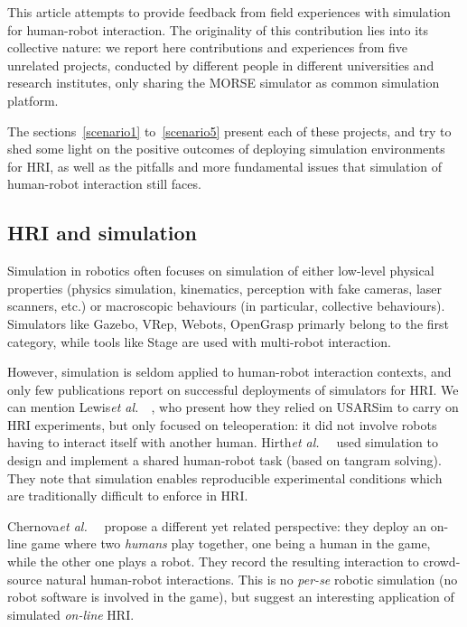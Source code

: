 \documentclass[conference]{IEEEtran}
\newcommand{\etal}{{\textit{et al.~}}}
\begin{document}



This article attempts to provide feedback from field experiences with simulation
for human-robot interaction. The originality of this contribution lies into its
collective nature: we report here contributions and experiences from five
unrelated projects, conducted by different people in different universities and
research institutes, only sharing the MORSE simulator as common simulation
platform.

The sections~\ref{scenario1} to~\ref{scenario5} present each of these projects,
and try to shed some light on the positive outcomes of deploying simulation
environments for HRI, as well as the pitfalls and more fundamental issues that
simulation of human-robot interaction still faces.

\subsection*{HRI and simulation}


Simulation in robotics often focuses on simulation of either low-level physical
properties (physics simulation, kinematics, perception with fake cameras, laser
scanners, etc.) or macroscopic behaviours (in particular, collective
behaviours). Simulators like Gazebo, VRep, Webots, OpenGrasp 
primarly belong to the first category, while tools like Stage  are used with multi-robot interaction.

However, simulation is seldom applied to human-robot interaction contexts, and
only few publications report on successful deployments of simulators for HRI.
We can mention Lewis\etal~\cite{lewis2007usarsim}, who present how they relied
on {\sc USARSim} to carry on HRI experiments, but only focused on
teleoperation: it did not involve robots having to interact itself with another
human.  Hirth\etal~\cite{hirth2013development} used simulation to design and
implement a shared human-robot task (based on tangram solving). They note that
simulation enables reproducible experimental conditions which are traditionally
difficult to enforce in HRI.

Chernova\etal~\cite{Chernova2011} propose a different yet related perspective:
they deploy an on-line game where two \emph{humans} play together, one being a
human in the game, while the other one plays a robot. They record the resulting
interaction to crowd-source natural human-robot interactions. This is no
\textit{per-se} robotic simulation (no robot software is involved in the game),
but suggest an interesting application of simulated \emph{on-line} HRI.
\end{document}
